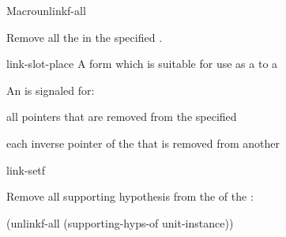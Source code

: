 \documentclass[10pt,twoside,english,pdftex]{article}
\begin{document}
\begin{functiondoc}{Macro}{unlinkf-all}{}
%
%

\fnsyntax

\fnpurpose Remove all the  in the specified
.

\fnpackage {}

\fnmodule {}

\fnargs
\begin{args}{link-slot-place}
 A form which is suitable for use as a
 to a 
\end{args}

\fnevents
{}%
%
%
An  is signaled for:
\begin{tightitemize}
\item all pointers that are removed from the specified
\item each inverse pointer of the  that is removed from
  another 
\end{tightitemize}

\begin{alsos}{link-setf}
\also[linkf]
\also[unlinkf]
\end{alsos}

\fnexample
Remove all supporting hypothesis  from the
  of the 
 :  
\begin{example}
  (unlinkf-all (supporting-hyps-of unit-instance))
\end{example}

\end{functiondoc}

\end{document}
